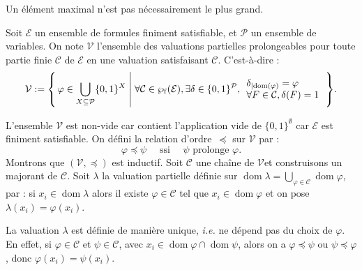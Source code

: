 \documentclass[./main]{subfiles}
\begin{document}
  \begin{rmk}
    Un élément maximal n'est pas nécessairement le plus grand.
  \end{rmk}

  \vspace{1.5em}

  \begin{prv}
    Soit $\mathcal{E}$ un ensemble de formules finiment satisfiable, et $\mathcal{P}$ un ensemble de variables.
    On note $\mathcal{V}$ l'ensemble des valuations partielles prolongeables pour toute partie finie $\mathcal{C}$ de $\mathcal{E}$ en une valuation satisfaisant $\mathcal{C}$.
    C'est-à-dire :
    {
      \footnotesize
    \[
    \mathcal{V} := \mleft\{\,\varphi \in \bigcup_{X \subseteq \mathcal{P}} \{0,1\}^X \;\middle|\; \forall \mathcal{C} \in \wp_\mathrm{f}(\mathcal{E}), \exists \delta \in \{0,1\}^\mathcal{P}, 
      \begin{array}{l}
        \delta_{|\mathrm{dom}(\varphi)} = \varphi\\
        \forall F \in \mathcal{C}, \delta(F) = 1
      \end{array}
    \,\mright\} 
    .\] 
    }

    L'ensemble $\mathcal{V}$ est non-vide car contient l'application vide de $\{0,1\}^\emptyset$ car $\mathcal{E}$ est finiment satisfiable.
    On défini la relation d'ordre~$\preceq$ sur  $\mathcal{V}$ par : \[
      \varphi \preceq \psi \quad \text{ ssi } \quad \psi \text{ prolonge } \varphi
    .\]
    Montrons que $(\mathcal{V}, \preceq)$ est inductif.
    Soit $\mathcal{C}$ une chaîne de $\mathcal{V}$et construisons un majorant de $\mathcal{C}$.
    Soit $\lambda$ la valuation partielle définie sur $\operatorname{dom}\lambda = \bigcup_{\varphi \in \mathcal{C}} \operatorname{dom} \varphi$, par : 
    si $x_i \in \operatorname{dom} \lambda$ alors il existe $\varphi \in \mathcal{C}$ tel que $x_i \in \operatorname{dom} \varphi$ et on pose $\lambda(x_i) = \varphi(x_i)$.

    La valuation $\lambda$ est définie de manière unique,  \textit{i.e.} ne dépend pas du choix de $\varphi$. En effet, si $\varphi \in \mathcal{C}$ et $\psi \in \mathcal{C}$, avec $x_i \in \operatorname{dom} \varphi \cap \operatorname{dom} \psi$, alors on a $\varphi \preceq \psi$ ou $\psi \preceq \varphi$, donc $\varphi(x_i) = \psi(x_i)$.


\end{prv}
\end{document}
